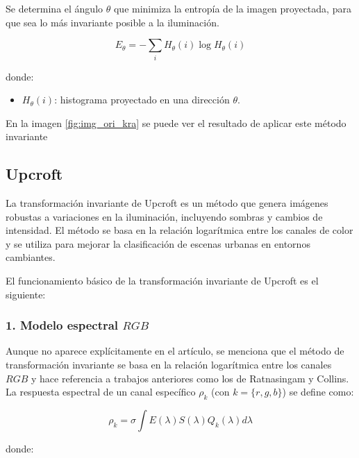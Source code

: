 Se determina el ángulo $\theta$ que minimiza la entropía de la imagen proyectada, para que sea lo más invariante posible a la iluminación.

$$E_{\theta } =-\sum_i H_{\theta } (i)\log H_{\theta } (i)$$

donde:

\begin{itemize}
\setlength{\itemsep}{-1ex}
   \item{\begin{flushleft} $H_{\theta } (i)$: histograma proyectado en una dirección $\theta$. \end{flushleft}}
\end{itemize}

En la imagen \ref{fig:img_ori_kra} se puede ver el resultado de aplicar este método invariante

\subsection{Upcroft}\label{upcrof}

La transformación invariante de Upcroft \cite{upcroft2014} es un método que genera imágenes robustas a variaciones en la iluminación, incluyendo sombras y cambios de intensidad. El método se basa en la relación logarítmica entre los canales de color y se utiliza para mejorar la clasificación de escenas urbanas en entornos cambiantes.

El funcionamiento básico de la transformación invariante de Upcroft es el siguiente:

\subsubsection{1. Modelo espectral $RGB$}

Aunque no aparece explícitamente en el artículo, se menciona que el método de transformación invariante se basa en la relación logarítmica entre los canales $RGB$ y hace referencia a trabajos anteriores como los de Ratnasingam y Collins. La respuesta espectral de un canal específico $\rho_k$ (con $k=\{r,g,b\}$) se define como:

$$\rho_k =\sigma \int E(\lambda )S(\lambda )Q_k (\lambda )d\lambda$$

donde:

